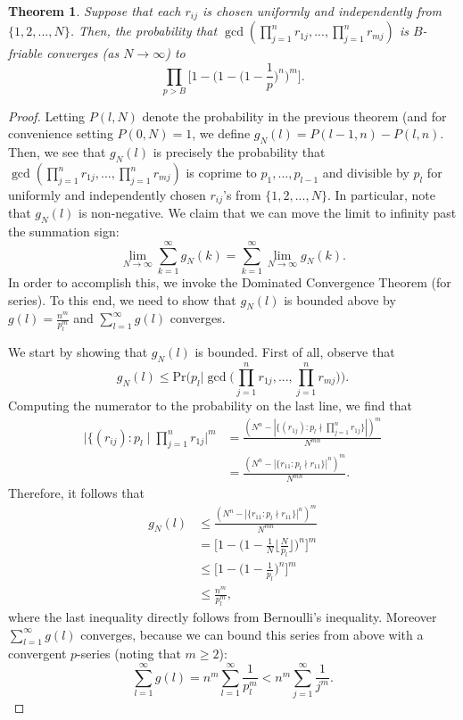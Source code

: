 \documentclass[10pt,a4paper]{article}
\newtheorem{theorem}{Theorem}[section]
\theoremstyle{definition}
\theoremstyle{remark}
\begin{document}
\begin{theorem} Suppose that each $r_{ij}$ is chosen uniformly and independently from $\{1, 2, ..., N\}$. Then, the probability that $\gcd(\prod_{j=1}^n r_{1j}, ... , \prod_{j=1}^n r_{mj})$ is $B$-friable converges (as $N \to \infty$) to
$$\prod_{p>B} \Big[1 - \Big(1 - \Big(1 - \frac{1}{p}\Big)^n \Big)^m \Big].$$
\end{theorem}

\begin{proof}
Letting $P(l, N)$ denote the probability in the previous theorem (and for convenience setting $P(0, N) = 1$, we define $g_N(l) = P(l-1, n) - P(l, n)$. Then, we see that $g_N(l)$ is precisely the probability that $\gcd(\prod_{j=1}^n r_{1j}, ... , \prod_{j=1}^n r_{mj})$ is coprime to $p_1, ..., p_{l-1}$ and divisible by $p_l$ for uniformly and independently chosen $r_{ij}$'s from $\{1, 2, ..., N\}$. In particular, note that $g_N(l)$ is non-negative. We claim that we can move the limit to infinity past the summation sign:
$$\lim_{N \to \infty} \sum_{k=1}^{\infty} g_N(k) = \sum_{k=1}^{\infty} \lim_{N \to \infty} g_N(k).$$
In order to accomplish this, we invoke the Dominated Convergence Theorem (for series). To this end, we need to show that $g_N(l)$ is bounded above by $g(l) = \frac{n^m}{p_l^m}$ and $\sum_{l=1}^{\infty} g(l)$ converges.

We start by showing that $g_N(l)$ is bounded. First of all, observe that
$$g_N(l) \leq \text{Pr}\Big(p_l \Big| \gcd\Big(\prod_{j=1}^n r_{1j}, ... , \prod_{j=1}^n r_{mj}\Big)\Big).$$
Computing the numerator to the probability on the last line, we find that
\begin{align*} 
\Big|\{(r_{ij}) : p_l \mid \prod_{j=1}^n r_{1j}\Big|^m &= \frac{(N^n - |\{(r_{1j}) : p_l \nmid \prod_{j=1}^n r_{1j}\}|)^m}{N^{mn}}\\
&= \frac{(N^n - |\{r_{11} : p_l \nmid r_{11}\}|^n)^m}{N^{mn}}. \end{align*}
Therefore, it follows that
\begin{align*} 
g_N(l) &\leq \frac{(N^n - |\{r_{11} : p_l \nmid r_{11}\}|^n)^m}{N^{mn}}\\
&= \Big[1 - \Big(1 - \frac{1}{N} \Big\lfloor \frac{N}{p_l}\Big\rfloor\Big)^n\Big]^m\\
&\leq \Big[1 - \Big(1 - \frac{1}{p_l}\Big)^n\Big]^m\\
&\leq \frac{n^m}{p_l^m},\end{align*}
where the last inequality directly follows from Bernoulli's inequality. Moreover $\sum_{l=1}^{\infty} g(l)$ converges, because we can bound this series from above with a convergent $p$-series (noting that $m \geq 2$):
$$\sum_{l=1}^{\infty} g(l) = n^m \sum_{l=1}^{\infty} \frac{1}{p_l^m} < n^m \sum_{j=1}^{\infty} \frac{1}{j^m}.$$


\end{proof}
\end{document}

